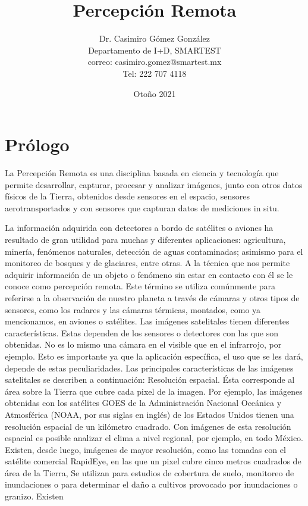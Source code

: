 \documentclass[12pt]{book}
\title{Percepción Remota}
\author{Dr. Casimiro Gómez González\\
	Departamento de I+D, SMARTEST\\
               correo: casimiro.gomez@smartest.mx\\
               Tel: 222 707 4118}
\date{Otoño 2021}
\theoremstyle{definition}
\theoremstyle{remark}
\theoremstyle{plain}
\begin{document}
\frontmatter
\maketitle


\chapter{Prólogo}

La Percepción Remota es una disciplina basada en ciencia y  tecnología que permite  desarrollar, capturar, procesar y analizar imágenes, junto con otros datos físicos de la Tierra, obtenidos  desde sensores en el espacio, sensores aerotransportados y con sensores que capturan datos de mediciones in situ.


La información adquirida con detectores a bordo de
satélites o aviones ha resultado de gran utilidad para
muchas y diferentes aplicaciones: agricultura,
minería, fenómenos naturales, detección de aguas
contaminadas; asimismo para el monitoreo de
bosques y de glaciares, entre otras.
A la técnica que nos permite adquirir información de
un objeto o fenómeno sin estar en contacto con él se
le conoce como percepción remota. Este término se
utiliza comúnmente para referirse a la observación de
nuestro planeta a través de cámaras y otros tipos de
sensores, como los radares y las cámaras térmicas,
montados, como ya mencionamos, en aviones o
satélites.
Las imágenes satelitales tienen diferentes
características. Estas dependen de los sensores o
detectores con las que son obtenidas. No es lo
mismo una cámara en el visible que en el infrarrojo,
por ejemplo. Esto es importante ya que la aplicación
específica, el uso que se les dará, depende de estas
peculiaridades.
Las principales características de las imágenes
satelitales se describen a continuación:
Resolución espacial. Ésta corresponde al área sobre
la Tierra que cubre cada pixel de la imagen. Por
ejemplo, las imágenes obtenidas con los satélites
GOES de la Administración Nacional Oceánica y
Atmosférica (NOAA, por sus siglas en inglés) de los
Estados Unidos tienen una resolución espacial de un
kilómetro cuadrado. Con imágenes de esta resolución
espacial es posible analizar el clima a nivel regional,
por ejemplo, en todo México.
Existen, desde luego, imágenes de mayor resolución,
como las tomadas con el satélite comercial
RapidEye, en las que un pixel cubre cinco metros
cuadrados de área de la Tierra, Se utilizan para
estudios de cobertura de suelo, monitoreo de
inundaciones o para determinar el daño a cultivos
provocado por inundaciones o granizo. Existen
\end{document}
